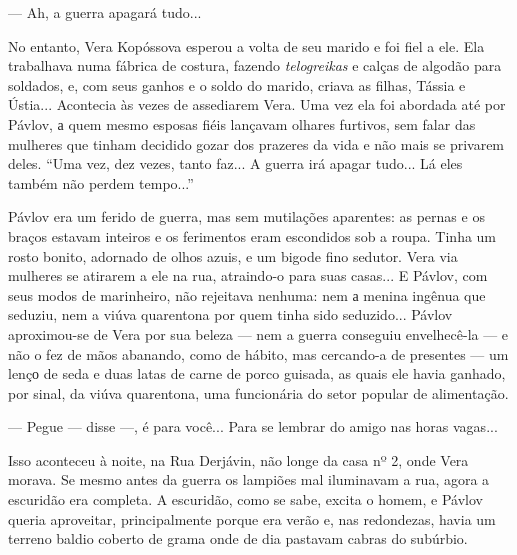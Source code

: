 --- Ah, a guerra apagará tudo...

No entanto, Vera Kopóssova esperou a volta de seu marido e foi fiel a
ele. Ela trabalhava numa fábrica de costura, fazendo \emph{telogreikas}
e calças de algodão para soldados, e, com seus ganhos e o soldo do
marido, criava as filhas, Tássia e Ústia... Acontecia às vezes de
assediarem Vera. Uma vez ela foi abordada até por Pávlov, а quem mesmo
esposas fiéis lançavam olhares furtivos, sem falar das mulheres que
tinham decidido gozar dos prazeres da vida e não mais se privarem deles.
``Uma vez, dez vezes, tanto faz... A guerra irá apagar tudo... Lá eles
também não perdem tempo...''

Pávlov era um ferido de guerra, mas sem mutilações aparentes: as pernas
e os braços estavam inteiros e os ferimentos eram escondidos sob a
roupa. Tinha um rosto bonito, adornado de olhos azuis, e um bigode fino
sedutor. Vera via mulheres se atirarem a ele na rua, atraindo-o para
suas casas... E Pávlov, com seus modos de marinheiro, não rejeitava
nenhuma: nem а menina ingênua que seduziu, nem a viúva quarentona por
quem tinha sido seduzido... Pávlov aproximou-se de Vera por sua beleza
--- nem a guerra conseguiu envelhecê-la --- e não o fez de mãos
abanando, como de hábito, mas cercando-a de presentes --- um lençо de
seda e duas latas de carne de porco guisada, as quais ele havia ganhado,
por sinal, da viúva quarentona, uma funcionária do setor popular de
alimentação.

--- Pegue --- disse ---, é para você... Para se lembrar do amigo nas
horas vagas...

Isso aconteceu à noite, na Rua Derjávin, não longe da casa nº 2, onde
Vera morava. Se mesmo antes da guerra os lampiões mal iluminavam a rua,
agora a escuridão era completa. A escuridão, como se sabe, excita o
homem, e Pávlov queria aproveitar, principalmente porque era verão e,
nas redondezas, havia um terreno baldio coberto de grama onde de dia
pastavam cabras do subúrbio.

